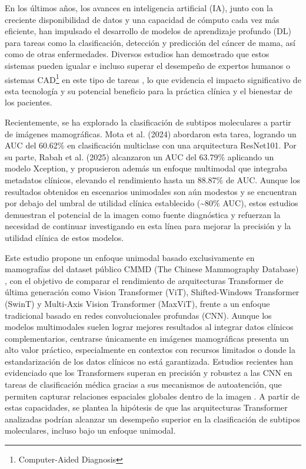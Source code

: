 \documentclass[a4paper,10pt]{book}
\begin{document}
En los últimos años, los avances en inteligencia artificial (IA), junto con la creciente disponibilidad de datos y una capacidad de cómputo cada vez más eficiente, han impulsado el desarrollo de modelos de aprendizaje profundo (DL) para tareas como la clasificación, detección y predicción del cáncer de mama, así como de otras enfermedades. Diversos estudios han demostrado que estos sistemas pueden igualar e incluso superar el desempeño de expertos humanos o sistemas CAD\footnote{Computer-Aided Diagnosis} en este tipo de tareas \cite{mckinney_international_2020,pattanaik_breast_2022,meenalochini_deep_2024,hussain_performance_2025}, lo que evidencia el impacto significativo de esta tecnología y su potencial beneficio para la práctica clínica y el bienestar de los pacientes.

Recientemente, se ha explorado la clasificación de subtipos moleculares a partir de imágenes mamográficas. Mota et al. (2024) \cite{mota_breast_2024} abordaron esta tarea, logrando un AUC del 60.62\% en clasificación multiclase con una arquitectura ResNet101. Por su parte, Rabah et al. (2025) \cite{ben_rabah_multimodal_2025} alcanzaron un AUC del 63.79\% aplicando un modelo Xception, y propusieron además un enfoque multimodal que integraba metadatos clínicos, elevando el rendimiento hasta un 88.87\% de AUC. Aunque los resultados obtenidos en escenarios unimodales son aún modestos y se encuentran por debajo del umbral de utilidad clínica establecido (\textasciitilde80\% AUC), estos estudios demuestran el potencial de la imagen como fuente diagnóstica y refuerzan la necesidad de continuar investigando en esta línea para mejorar la precisión y la utilidad clínica de estos modelos.

Este estudio propone un enfoque unimodal basado exclusivamente en mamografías del dataset público CMMD (The Chinese Mammography Database) \cite{cai_online_2023}, con el objetivo de comparar el rendimiento de arquitecturas Transformer de última generación como Vision Transformer (ViT), Shifted-Windows Transformer (SwinT) y Multi-Axis Vision Transformer (MaxViT), frente a un enfoque tradicional basado en redes convolucionales profundas (CNN). Aunque los modelos multimodales suelen lograr mejores resultados al integrar datos clínicos complementarios, centrarse únicamente en imágenes mamográficas presenta un alto valor práctico, especialmente en contextos con recursos limitados o donde la estandarización de los datos clínicos no está garantizada. Estudios recientes han evidenciado que los Transformers superan en precisión y robustez a las CNN en tareas de clasificación médica gracias a sus mecanismos de autoatención, que permiten capturar relaciones espaciales globales dentro de la imagen \cite{mauricio_comparing_2023}. A partir de estas capacidades, se plantea la hipótesis de que las arquitecturas Transformer analizadas podrían alcanzar un desempeño superior en la clasificación de subtipos moleculares, incluso bajo un enfoque unimodal.
\end{document}
